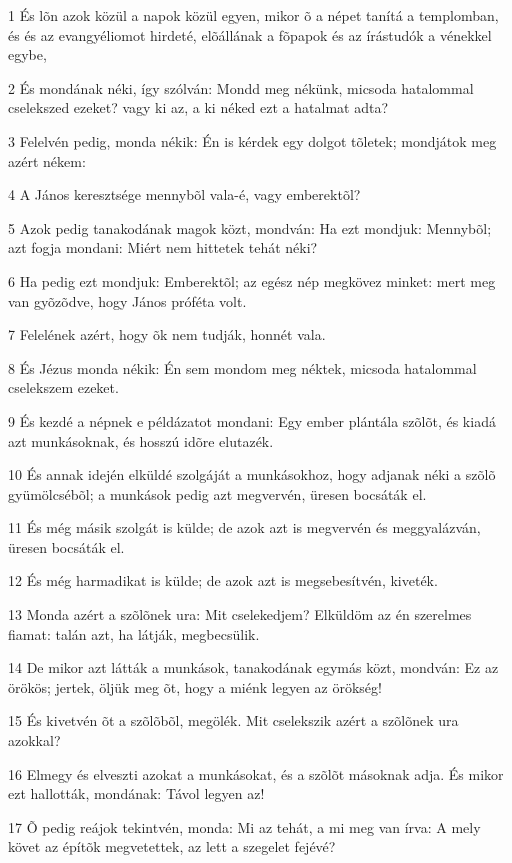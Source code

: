 \par 1 És lõn azok közül a napok közül egyen, mikor õ a népet tanítá a templomban, és és az evangyéliomot hirdeté, elõállának a fõpapok és az írástudók a vénekkel egybe,
\par 2 És mondának néki, így szólván: Mondd meg nékünk, micsoda hatalommal cselekszed ezeket? vagy ki az, a ki néked ezt a hatalmat adta?
\par 3 Felelvén pedig, monda nékik: Én is kérdek egy dolgot tõletek; mondjátok meg azért nékem:
\par 4 A János keresztsége mennybõl vala-é, vagy emberektõl?
\par 5 Azok pedig tanakodának magok közt, mondván: Ha ezt mondjuk: Mennybõl; azt fogja mondani: Miért nem hittetek tehát néki?
\par 6 Ha pedig ezt mondjuk: Emberektõl; az egész nép megkövez minket: mert meg van gyõzõdve, hogy János próféta volt.
\par 7 Felelének azért, hogy õk nem tudják, honnét vala.
\par 8 És Jézus monda nékik: Én sem mondom meg néktek, micsoda hatalommal cselekszem ezeket.
\par 9 És kezdé a népnek e példázatot mondani: Egy ember plántála szõlõt, és kiadá azt munkásoknak, és hosszú idõre elutazék.
\par 10 És annak idején elküldé szolgáját a munkásokhoz, hogy adjanak néki a szõlõ gyümölcsébõl; a munkások pedig azt megvervén, üresen bocsáták el.
\par 11 És még másik szolgát is külde; de azok azt is megvervén és meggyalázván, üresen bocsáták el.
\par 12 És még harmadikat is külde; de azok azt is megsebesítvén, kiveték.
\par 13 Monda azért a szõlõnek ura: Mit cselekedjem? Elküldöm az én szerelmes fiamat: talán azt, ha látják, megbecsülik.
\par 14 De mikor azt látták a munkások, tanakodának egymás közt, mondván: Ez az örökös; jertek, öljük meg õt, hogy a miénk legyen az örökség!
\par 15 És kivetvén õt a szõlõbõl, megölék. Mit cselekszik azért a szõlõnek ura azokkal?
\par 16 Elmegy és elveszti azokat a munkásokat, és a szõlõt  másoknak adja. És mikor ezt hallották, mondának: Távol legyen az!
\par 17 Õ pedig reájok tekintvén, monda: Mi az tehát, a mi meg van írva: A mely követ az építõk megvetettek, az lett a szegelet fejévé?
